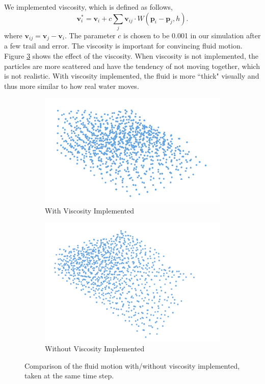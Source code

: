 \documentclass[sigconf]{acmart}
\newcommand{\vect}[1]{\boldsymbol{#1}}
\begin{document}
We implemented viscosity, which is defined as follows,
\begin{equation}
  \vect{v}_i^* = \vect{v}_i + c \sum_j \vect{v}_{ij} \cdot W(\vect{p}_i-\vect{p}_j, h) \tag*{16}.
\end{equation}
where $\vect{v}_{ij} = \vect{v}_j - \vect{v}_i$. The parameter $c$ is chosen to be 0.001 in our simulation after a few trail and error.
The viscosity is important for convincing fluid motion. Figure \ref{fig:viscosity} shows the effect of the viscosity. When viscosity is not implemented, the particles are more scattered and have the tendency of not moving together, which is not realistic. With viscosity implemented, the fluid is more ``thick" visually and thus more similar to how real water moves.
\begin{figure}
  \centering
  \begin{subfigure}{.5\textwidth}
    \centering
    \includegraphics[width=.6\linewidth]{image/with-viscosity.png}
    \caption{With Viscosity Implemented}
    \label{fig:with-viscosity}
  \end{subfigure}
  \begin{subfigure}{.5\textwidth}
    \centering
    \includegraphics[width=.6\linewidth]{image/without-viscosity.png}
    \caption{Without Viscosity Implemented}
    \label{fig:without-viscosity}
  \end{subfigure}
  \caption{Comparison of the fluid motion with/without viscosity implemented, taken at the same time step.}
\label{fig:viscosity}
\end{figure}
\end{document}
